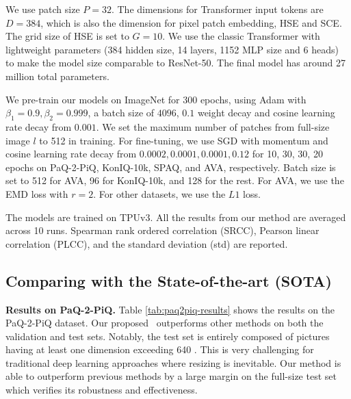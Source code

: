 We use patch size $P = 32$. The dimensions for Transformer input tokens are $D=384$, which is also the dimension for pixel patch embedding, HSE and SCE. The grid size of HSE is set to $G=10$. We use the classic Transformer \cite{NIPS2017_3f5ee243} with lightweight parameters (384 hidden size, 14 layers, 1152 MLP size and 6 heads) to make the model size comparable to ResNet-50. The final model has around 27 million total parameters.

We pre-train our models on ImageNet for 300 epochs, using Adam with $\beta_1=0.9, \beta_2 =0.999$, a batch size of $4096$, $0.1$ weight decay and cosine learning rate decay from $0.001$. We set the maximum number of patches from full-size image $l$ to 512 in training. For fine-tuning, we use SGD with momentum and cosine learning rate decay from $0.0002, 0.0001, 0.0001, 0.12$ for 10, 30, 30, 20 epochs on PaQ-2-PiQ, KonIQ-10k, SPAQ, and AVA, respectively. Batch size is set to 512 for AVA, 96 for KonIQ-10k, and 128 for the rest. For AVA, we use the EMD loss with $r=2$. For other datasets, we use the $L1$ loss.

The models are trained on TPUv3. All the results from our method are averaged across 10 runs. Spearman rank ordered correlation (SRCC), Pearson linear correlation (PLCC), and the standard deviation (std) are reported.

\subsection{Comparing with the State-of-the-art (SOTA)}
\noindent\textbf{Results on PaQ-2-PiQ.} Table \ref{tab:paq2piq-results} shows the results on the PaQ-2-PiQ dataset. Our proposed \ours\ outperforms other methods on both the validation and test sets. Notably, the test set is entirely composed of pictures having at least one dimension exceeding 640 \cite{ying2020patches}. This is very challenging for traditional deep learning approaches where resizing is inevitable. Our method is able to outperform previous methods by a large margin on the full-size test set which verifies its robustness and effectiveness. 

